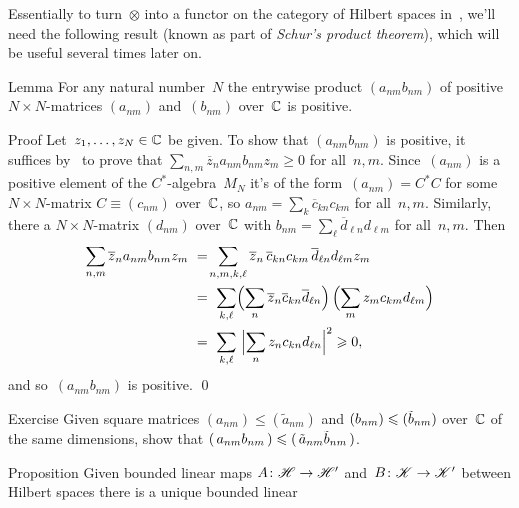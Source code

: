 \documentclass[a]{subfiles}
\begin{document}
\begin{parsec}%
\begin{point}%
Essentially to turn~$\otimes$
into a functor on
the category of Hilbert spaces
in~,
we'll need
the following result
(known as part of \emph{Schur's product theorem}),
which will be useful several times later on.
\end{point}
\begin{point}[schur]{Lemma}%
For any natural number~$N$
the entrywise product 
$(a_{nm}b_{nm})$
of positive  $N\times N$-matrices
$(a_{nm})$ and~$(b_{nm})$
over~$\C$
is positive.
\begin{point}{Proof}%
Let~$z_1,\dotsc,z_N\in\C$ be given.
To show that $(a_{nm}b_{nm})$
is positive,
it suffices by~ 
to prove that
$\sum_{n,m} \overline{z}_n a_{nm} b_{nm} z_m \geq 0$
for all~$n,m$.
Since~$(a_{nm})$
is a positive element
of the $C^*$-algebra~$M_N$
it's of the form~$(a_{nm})=C^*C$
for some $N\times N$-matrix $C\equiv(c_{nm})$
over~$\C$,
so  $a_{nm} = \sum_k \overline{c}_{kn} c_{km}$
for all~$n,m$.
Similarly, there a $N\times N$-matrix
$(d_{nm})$ over~$\C$
with $b_{nm} = \sum_\ell \overline{d}_{\ell n}
d_{\ell m}$
for all~$n,m$.
Then
\begin{alignat*}{3}
	\sum_{n,m} \overline{z}_n
a_{nm} b_{nm} z_m
\ &=\  \hspace{-.5em} \sum_{n,m,k,\ell}
\overline{z}_n \,\overline{c}_{kn}
c_{km} \,\overline{d}_{\ell n} d_{\ell m} z_m\,
\\
\ &=\  \sum_{k,\ell}
\Bigl(\sum_n
\overline{z}_n\overline{c}_{kn}
\overline{d}_{\ell n} \Bigr)
\,
\Bigl(
\sum_m
z_m
c_{km} 
d_{\ell m} 
\Bigr)
\\
\ &=\  \sum_{k,\ell}\ 
\Bigl|\sum_n z_n c_{kn} d_{\ell n} \Bigr|^2 \geq 0,
\end{alignat*}
and so~$(a_{nm}b_{nm})$ is positive.
\qed
\end{point}
\end{point}
\begin{point}{Exercise}%
Given square matrices 
$(a_{nm})\leq (\tilde{a}_{nm})$
and $(b_{nm})\leq (\smash{\tilde{b}_{nm}})$
over~$\C$
of the same dimensions,
show that $(\,a_{nm}b_{nm}\,)\leq (\,\tilde{a}_{nm}\smash{\tilde{b}_{nm}}\,)$.
\end{point}
\begin{point}{Proposition}%
Given bounded linear maps
$A\colon \scrH\to\scrH'$
and~$B\colon \scrK\to\scrK'$
between Hilbert spaces
there is a unique bounded linear

\end{point}
\end{parsec}
\end{document}
